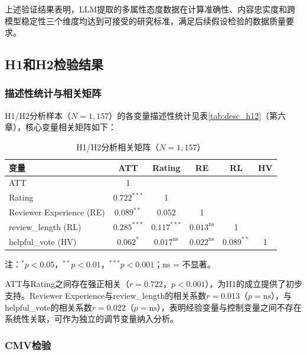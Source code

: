 上述验证结果表明，LLM提取的多属性态度数据在计算准确性、内容忠实度和跨模型稳定性三个维度均达到可接受的研究标准，满足后续假设检验的数据质量要求。

\subsection{H1和H2检验结果}

\subsubsection{描述性统计与相关矩阵}

H1/H2分析样本（$N=1{,}157$）的各变量描述性统计见表\ref{tab:desc_h12}（第六章），核心变量相关矩阵如下：

\begin{table}[htbp]
\centering
\caption{H1/H2分析相关矩阵（$N=1{,}157$）}
\label{tab:corr_h12}
\begin{threeparttable}
\begin{tabular}{@{}lccccc@{}}
\toprule
变量 & ATT & Rating & RE & RL & HV \\
\midrule
ATT & 1 & & & & \\
Rating & $0.722^{***}$ & 1 & & & \\
Reviewer Experience (RE) & $0.089^{**}$ & $0.052$ & 1 & & \\
review\_length (RL) & $0.285^{***}$ & $0.117^{***}$ & $0.013^{\text{ns}}$ & 1 & \\
helpful\_vote (HV) & $0.062^{*}$ & $0.017^{\text{ns}}$ & $0.022^{\text{ns}}$ & $0.089^{**}$ & 1 \\
\bottomrule
\end{tabular}
\begin{tablenotes}
\small
\item 注：$^{*}p<0.05$，$^{**}p<0.01$，$^{***}p<0.001$；ns = 不显著。
\end{tablenotes}
\end{threeparttable}
\end{table}

ATT与Rating之间存在强正相关（$r=0.722$，$p<0.001$），为H1的成立提供了初步支持。Reviewer Experience与review\_length的相关系数$r=0.013$（$p=\text{ns}$），与helpful\_vote的相关系数$r=0.022$（$p=\text{ns}$），表明经验变量与控制变量之间不存在系统性关联，可作为独立的调节变量纳入分析。

\subsubsection{CMV检验}

